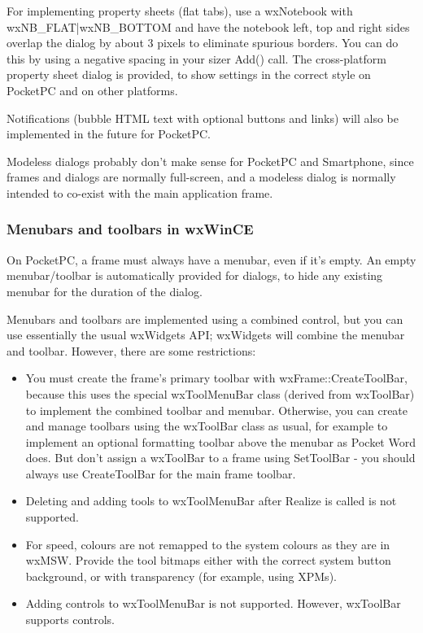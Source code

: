 For implementing property sheets (flat tabs), use a wxNotebook with wxNB\_FLAT|wxNB\_BOTTOM
and have the notebook left, top and right sides overlap the dialog by about 3 pixels
to eliminate spurious borders. You can do this by using a negative spacing in your
sizer Add() call. The cross-platform property sheet dialog  is
provided, to show settings in the correct style on PocketPC and on other platforms.

Notifications (bubble HTML text with optional buttons and links) will also be
implemented in the future for PocketPC.

Modeless dialogs probably don't make sense for PocketPC and Smartphone, since
frames and dialogs are normally full-screen, and a modeless dialog is normally
intended to co-exist with the main application frame.

\subsubsection{Menubars and toolbars in wxWinCE}


On PocketPC, a frame must always have a menubar, even if it's empty.
An empty menubar/toolbar is automatically provided for dialogs, to hide
any existing menubar for the duration of the dialog.

Menubars and toolbars are implemented using a combined control,
but you can use essentially the usual wxWidgets API; wxWidgets will combine the menubar
and toolbar. However, there are some restrictions:

\itemsep=0pt
\begin{itemize}
\item You must create the frame's primary toolbar with wxFrame::CreateToolBar,
because this uses the special wxToolMenuBar class (derived from wxToolBar)
to implement the combined toolbar and menubar. Otherwise, you can create and manage toolbars
using the wxToolBar class as usual, for example to implement an optional
formatting toolbar above the menubar as Pocket Word does. But don't assign
a wxToolBar to a frame using SetToolBar - you should always use CreateToolBar
for the main frame toolbar.
\item Deleting and adding tools to wxToolMenuBar after Realize is called is not supported.
\item For speed, colours are not remapped to the system colours as they are
in wxMSW. Provide the tool bitmaps either with the correct system button background,
or with transparency (for example, using XPMs).
\item Adding controls to wxToolMenuBar is not supported. However, wxToolBar supports
controls.
\end{itemize}

